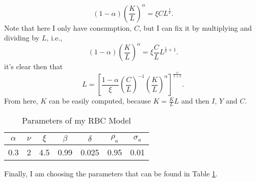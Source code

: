 \begin{equation}
	(1-\alpha)\left(\frac{K}{L}\right)^\alpha = \xi C L^{\frac{1}{\nu}}.
\end{equation}
Note that here I only have consumption, $C$, but I can fix it by multiplying and dividing by $L$, i.e.,
\begin{equation}
	(1-\alpha)\left(\frac{K}{L}\right)^\alpha = \xi \frac{C}{L} L^{\frac{1}{\nu}+1}.
\end{equation}
it's clear then that
\begin{equation}
	L = \left[\frac{1-\alpha}{\xi}\left(\frac{C}{L}\right)^{-1} \left(\frac{K}{L}\right)^{\alpha}\right]^{\frac{\nu}{1+\nu}}.
\end{equation}
From here, $K$ can be easily computed, because $K = \frac{K}{L} L$ and then $I$, $Y$ and $C$.
\begin{table}
	\centering
	\caption{Parameters of my RBC Model}\label{tab:params}
	\begin{tabular}{ccccccc}
		$\alpha$ &$\nu$ & $\xi$ & $\beta$ & $\delta$ & $\rho_a$ & $\sigma_a$\\\hline\hline
		0.3 & 2 & 4.5 & 0.99 & 0.025 & 0.95 & 0.01 \\\hline
	\end{tabular}
\end{table}
Finally, I am choosing the parameters that can be found in Table \ref{tab:params}.
